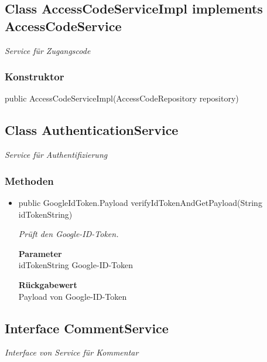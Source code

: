 \documentclass[a4paper]{scrreprt}
\begin{document}
        \subsection{Class AccessCodeServiceImpl implements AccessCodeService}
        \textit{Service für Zugangscode}
        \subsubsection{Konstruktor}
        public AccessCodeServiceImpl(AccessCodeRepository repository)
        \subsection{Class AuthenticationService}
        \textit{Service für Authentifizierung}
        \subsubsection{Methoden}
        \begin{itemize}
        	\item{public GoogleIdToken.Payload verifyIdTokenAndGetPayload(String idTokenString)}
        	
        	\textit{Prüft den Google-ID-Token.}
        	
        	\textbf{Parameter} \\
        	idTokenString Google-ID-Token
        	
        	\textbf{Rückgabewert} \\
        	Payload von Google-ID-Token
        \end{itemize}
        \subsection{Interface CommentService}
        \textit{Interface von Service für Kommentar}
\end{document}
